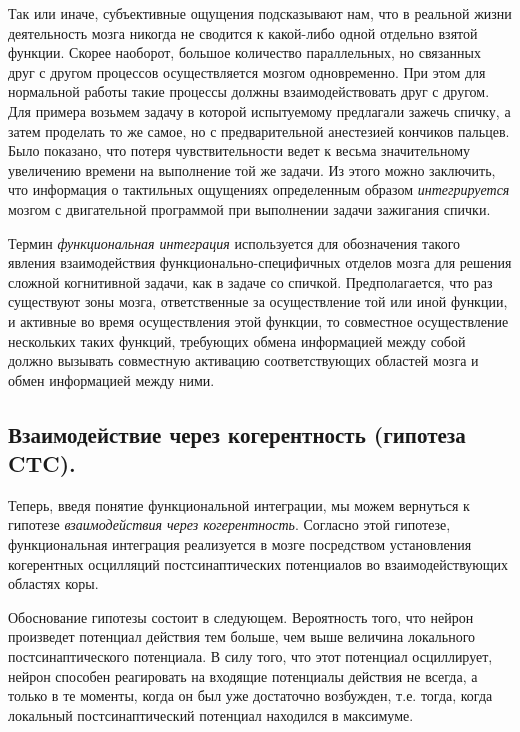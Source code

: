 Так или иначе, субъективные ощущения подсказывают нам, что в реальной жизни
деятельность мозга никогда не сводится к какой-либо одной отдельно взятой
функции. Скорее наоборот, большое
количество параллельных, но связанных друг с другом процессов осуществляется
мозгом одновременно. При этом для нормальной работы такие процессы должны
взаимодействовать друг с другом.  Для примера возьмем задачу в которой
испытуемому предлагали зажечь спичку, а затем проделать то же самое, но с
предварительной анестезией кончиков пальцев. Было показано, что потеря
чувствительности ведет к весьма значительному увеличению времени на выполнение
той же задачи.  Из этого можно заключить, что информация о тактильных ощущениях
определенным образом \emph{интегрируется} мозгом с двигательной программой при
выполнении задачи зажигания спички.

Термин \emph{функциональная интеграция} используется для обозначения такого
явления взаимодействия функционально-специфичных отделов мозга для решения
сложной когнитивной задачи, как в задаче со спичкой.  Предполагается, что раз
существуют зоны мозга, ответственные за осуществление той или иной функции, и
активные во время осуществления этой функции, то совместное осуществление
нескольких таких функций, требующих обмена информацией между собой должно
вызывать совместную активацию соответствующих областей мозга и обмен
информацией между ними.

\subsection{Взаимодействие через когерентность (гипотеза CTC).}

Теперь, введя понятие функциональной интеграции, мы можем вернуться к гипотезе
\emph{взаимодействия через когерентность}. Согласно этой гипотезе,
функциональная интеграция реализуется в мозге посредством установления
когерентных осцилляций постсинаптических потенциалов во взаимодействующих
областях коры.


Обоснование гипотезы состоит в следующем.  Вероятность того, что нейрон
произведет потенциал действия тем больше, чем выше величина локального
постсинаптического потенциала. В силу того, что этот потенциал осциллирует,
нейрон способен реагировать на входящие потенциалы действия не всегда, а только
в те моменты, когда он был уже достаточно возбужден, т.е. тогда, когда
локальный постсинаптический потенциал находился в максимуме.

